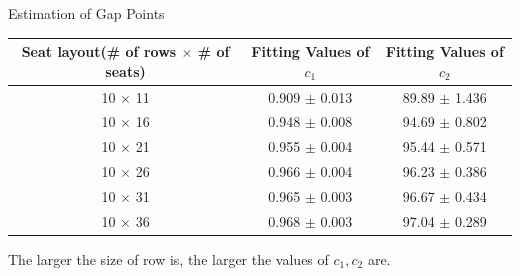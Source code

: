 \begin{frame}{Estimation of Gap Points}
    \scriptsize
    \begin{table}[ht]
      \centering
      \begin{tabular}{|c|c|c|}
      \hline
       Seat layout(\# of rows $\times$ \# of seats) & Fitting Values of $c_1$ & Fitting Values of $c_2$  \\
      \hline
       10 $\times$ 11 & 0.909 $\pm$ 0.013  & 89.89 $\pm$ 1.436 \\
       10 $\times$ 16 & 0.948 $\pm$ 0.008  & 94.69 $\pm$ 0.802 \\
       10 $\times$ 21 & 0.955 $\pm$ 0.004 & 95.44 $\pm$ 0.571 \\
       10 $\times$ 26 & 0.966 $\pm$ 0.004 & 96.23 $\pm$ 0.386 \\
       10 $\times$ 31 & 0.965 $\pm$ 0.003 & 96.67 $\pm$ 0.434 \\
       10 $\times$ 36 & 0.968 $\pm$ 0.003 & 97.04 $\pm$ 0.289 \\
       \hline
      \end{tabular}
    \end{table}
    
    The larger the size of row is, the larger the values of $c_1, c_2$ are. 
    
  
  \end{frame}



    

        

